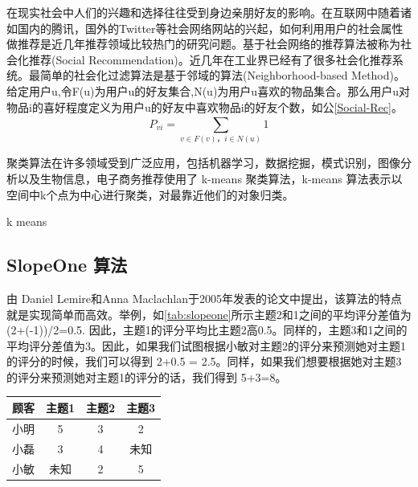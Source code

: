 		在现实社会中人们的兴趣和选择往往受到身边亲朋好友的影响。在互联网中随着诸如国内的腾讯，国外的Twitter等社会网络网站的兴起，如何利用用户的社会属性做推荐是近几年推荐领域比较热门的研究问题。基于社会网络的推荐算法被称为社会化推荐(Social Recommendation)。近几年在工业界已经有了很多社会化推荐系统。最简单的社会化过滤算法是基于邻域的算法(Neighborhood-based Method)。给定用户u,令F(u)为用户u的好友集合,N(u)为用户u喜欢的物品集合。那么用户u对物品i的喜好程度定义为用户u的好友中喜欢物品i的好友个数，如公\autoref{Social-Rec}。
		\begin{equation}
			P_{vi} = \sum_{v\in F(v)，i\in N(u)}^{} 1
			\label{Social-Rec}
		\end{equation}

		聚类算法在许多领域受到广泛应用，包括机器学习，数据挖掘，模式识别，图像分析以及生物信息，电子商务推荐使用了 k-means 聚类算法，k-means 算法表示以空间中k个点为中心进行聚类，对最靠近他们的对象归类。
		\IncMargin{1em}
		\begin{algorithm}
			\BlankLine
		\caption{k means}\label{k-means}
		\end{algorithm}
		\DecMargin{1em}

		\subsection{SlopeOne 算法}
		由 Daniel Lemire和Anna Maclachlan于2005年发表的论文中提出，该算法的特点就是实现简单而高效。举例，如\autoref{tab:slopeone}所示主题2和1之间的平均评分差值为 (2+(-1))/2=0.5. 因此，主题1的评分平均比主题2高0.5。同样的，主题3和1之间的平均评分差值为3。因此，如果我们试图根据小敏对主题2的评分来预测她对主题1的评分的时候，我们可以得到 2+0.5 = 2.5。同样，如果我们想要根据她对主题3的评分来预测她对主题1的评分的话，我们得到 5+3=8。
		
		\begin{table}[htp]
		\centering
		\label{tab:slopeone}
		\begin{tabular}{ |c|c|c|c| } \hline
		 顾客 & 主题1 & 主题2 & 主题3\\ \hline
		 小明 & 5 & 3 & 2 \\ \hline
		 小磊 & 3 & 4 & 未知 \\ \hline
		 小敏 & 未知 & 2 & 5 \\ \hline
		\end{tabular}
		\end{table}

